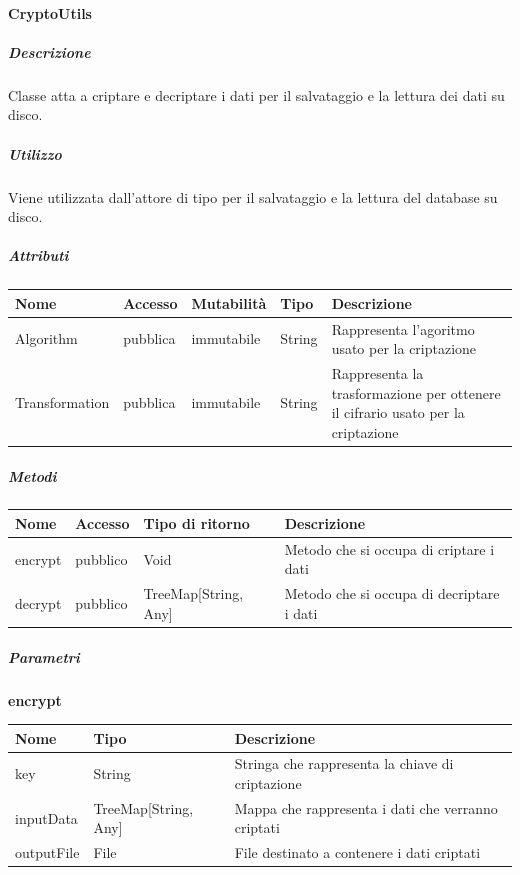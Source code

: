 \documentclass{scalatekids-article}
\begin{document}

\paragraph{CryptoUtils}
\label{sec:actorbase::actorsystem::utils::CryptoUtils}

\subparagraph{Descrizione}
Classe atta a criptare e decriptare i dati per il salvataggio e la lettura dei dati su disco.

\subparagraph{Utilizzo}
Viene utilizzata dall'attore di tipo  per il salvataggio e la lettura del database su disco.

\subparagraph{Attributi}
\begin{tabular}{| p{3cm} | p{1.5cm} | p{2cm} | p{2cm} | p{8.5cm} |}
  \hline
  Nome & Accesso & Mutabilità & Tipo & Descrizione\\
  \hline
  Algorithm & pubblica & immutabile & String & Rappresenta l'agoritmo usato per la criptazione \\
  \hline
  Transformation & pubblica & immutabile & String & Rappresenta la trasformazione per ottenere il cifrario usato per la criptazione \\
  \hline
\end{tabular}

\subparagraph{Metodi} %
\begin{tabular}{| p{3cm} | p{1.5cm} | p{3.5cm} | p{9cm} |}
  \hline
  Nome & Accesso & Tipo di ritorno & Descrizione\\
  \hline
  encrypt & pubblico & Void & Metodo che si occupa di criptare i dati \\
  \hline
  decrypt & pubblico & TreeMap[String, Any] & Metodo che si occupa di decriptare i dati \\
  \hline
\end{tabular}

\subparagraph{Parametri}
\begin{center}
  \textbf{encrypt}\\
\end{center}
\begin{tabular}{| l | l | l |}
  \hline
  Nome & Tipo & Descrizione\\
  \hline
  key & String & Stringa che rappresenta la chiave di criptazione \\
  \hline
  inputData & TreeMap[String, Any] & Mappa che rappresenta i dati che verranno criptati \\
  \hline
  outputFile & File & File destinato a contenere i dati criptati \\
  \hline
\end{tabular}
\end{document}
